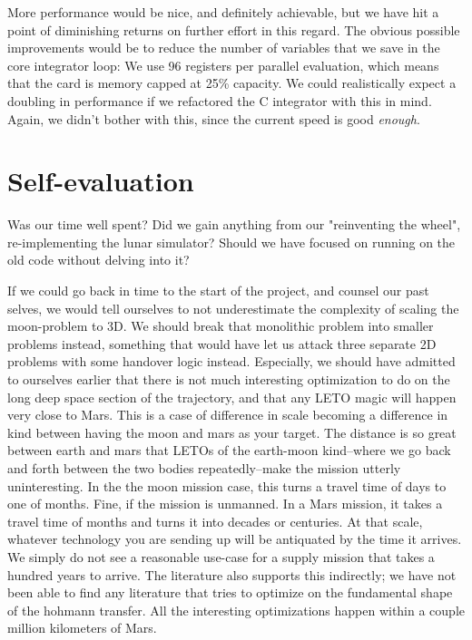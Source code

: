 More performance would be nice, and definitely achievable, but we have hit a point of diminishing returns on further effort in this regard. The obvious possible improvements would be to reduce the number of variables that we save in the core integrator loop: We use 96 registers per parallel evaluation, which means that the card is memory capped at 25\% capacity. We could realistically expect a doubling in performance if we refactored the C integrator with this in mind. Again, we didn't bother with this, since the current speed is good \textit{enough}.

\section{Self-evaluation}
Was our time well spent? Did we gain anything from our "reinventing the wheel", re-implementing the lunar simulator? Should we have focused on running on the old code without delving into it?

If we could go back in time to the start of the project, and counsel our past selves, we would tell ourselves to not underestimate the complexity of scaling the moon-problem to 3D. We should break that monolithic problem into smaller problems instead, something that would have let us attack three separate 2D problems with some handover logic instead. Especially, we should have admitted to ourselves earlier that there is not much interesting optimization to do on the long deep space section of the trajectory, and that any LETO magic will happen very close to Mars. This is a case of difference in scale becoming a difference in kind between having the moon and mars as your target. The distance is so great between earth and mars that LETOs of the earth-moon kind--where we go back and forth between the two bodies repeatedly--make the mission utterly uninteresting. In the the moon mission case, this turns a travel time of days to one of months. Fine, if the mission is unmanned. In a Mars mission, it takes a travel time of months and turns it into decades or centuries. At that scale, whatever technology you are sending up will be antiquated by the time it arrives. We simply do not see a reasonable use-case for a supply mission that takes a hundred years to arrive. The literature also supports this indirectly; we have not been able to find any literature that tries to optimize on the fundamental shape of the hohmann transfer. All the interesting optimizations happen within a couple million kilometers of Mars.